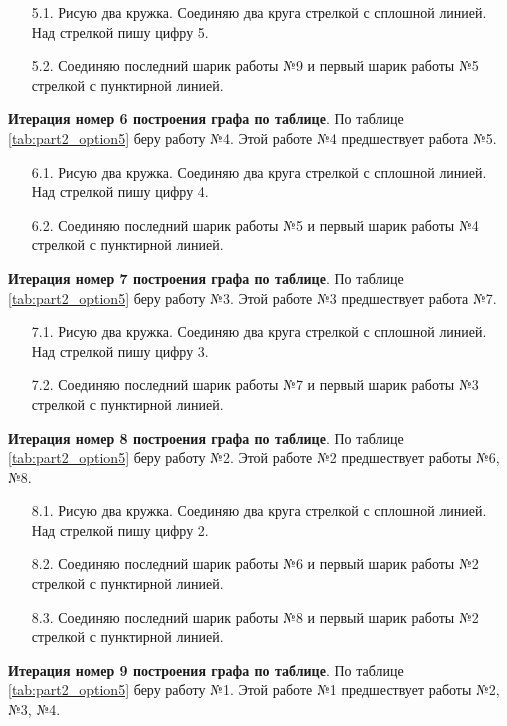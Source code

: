 \begin{enumerate}
  \item[5.1.] Рисую два кружка. Соединяю два круга стрелкой с сплошной линией. Над стрелкой пишу цифру 5.
  \item[5.2.] Соединяю последний шарик работы №9 и первый шарик работы №5 стрелкой с пунктирной линией.
\end{enumerate}

\textbf{Итерация номер 6 построения графа по таблице}. По таблице \ref{tab:part2_option5} беру работу №4. Этой работе №4 предшествует работа №5.

\begin{enumerate}
  \item[6.1.] Рисую два кружка. Соединяю два круга стрелкой с сплошной линией. Над стрелкой пишу цифру 4.
  \item[6.2.] Соединяю последний шарик работы №5 и первый шарик работы №4 стрелкой с пунктирной линией.
\end{enumerate}

\textbf{Итерация номер 7 построения графа по таблице}. По таблице \ref{tab:part2_option5} беру работу №3. Этой работе №3 предшествует работа №7.

\begin{enumerate}
  \item[7.1.] Рисую два кружка. Соединяю два круга стрелкой с сплошной линией. Над стрелкой пишу цифру 3.
  \item[7.2.] Соединяю последний шарик работы №7 и первый шарик работы №3 стрелкой с пунктирной линией.
\end{enumerate}

\textbf{Итерация номер 8 построения графа по таблице}. По таблице \ref{tab:part2_option5} беру работу №2. Этой работе №2 предшествует работы №6, №8.

\begin{enumerate}
  \item[8.1.] Рисую два кружка. Соединяю два круга стрелкой с сплошной линией. Над стрелкой пишу цифру 2.
  \item[8.2.] Соединяю последний шарик работы №6 и первый шарик работы №2 стрелкой с пунктирной линией.
  \item[8.3.] Соединяю последний шарик работы №8 и первый шарик работы №2 стрелкой с пунктирной линией.
\end{enumerate}

\textbf{Итерация номер 9 построения графа по таблице}. По таблице \ref{tab:part2_option5} беру работу №1. Этой работе №1 предшествует работы №2, №3, №4.

